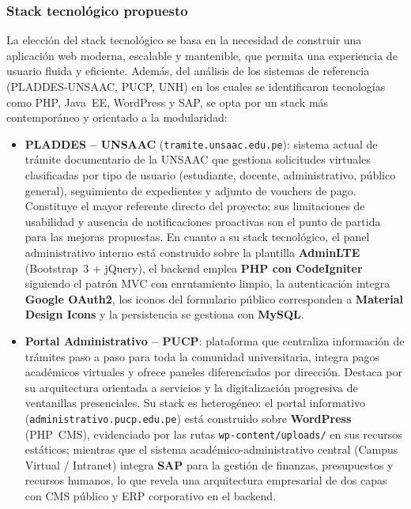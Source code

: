 \subsubsection{Stack tecnológico propuesto}
La elección del stack tecnológico se basa en la necesidad de construir una aplicación
web moderna, escalable y mantenible, que permita una experiencia de usuario fluida y
eficiente. Además, del análisis de los sistemas de referencia (PLADDES-UNSAAC, PUCP, UNH)
en los cuales se identificaron tecnologías como PHP, Java~EE, WordPress y SAP, se opta 
por un stack más contemporáneo y orientado a la modularidad:
\begin{itemize}
  \item \textbf{PLADDES -- UNSAAC} (\texttt{tramite.unsaac.edu.pe}): sistema actual
    de trámite documentario de la UNSAAC que gestiona solicitudes virtuales
    clasificadas por tipo de usuario (estudiante, docente, administrativo, público
    general), seguimiento de expedientes y adjunto de vouchers de pago.
    Constituye el mayor referente directo del proyecto; sus limitaciones de
    usabilidad y ausencia de notificaciones proactivas son el punto de partida
    para las mejoras propuestas.
    En cuanto a su stack tecnológico, el panel administrativo interno está
    construido sobre la plantilla \textbf{AdminLTE} (Bootstrap~3 + jQuery),
    el backend emplea \textbf{PHP con CodeIgniter} siguiendo el patrón MVC
    con enrutamiento limpio, la autenticación integra \textbf{Google OAuth2},
    los iconos del formulario público corresponden a \textbf{Material Design
    Icons} y la persistencia se gestiona con \textbf{MySQL}.

  \item \textbf{Portal Administrativo -- PUCP}: plataforma que centraliza
    información de trámites paso a paso para toda la comunidad universitaria,
    integra pagos académicos virtuales y ofrece paneles diferenciados por
    dirección. Destaca por su arquitectura orientada a servicios y la
    digitalización progresiva de ventanillas presenciales.
    Su stack es heterogéneo: el portal informativo
    (\texttt{administrativo.pucp.edu.pe}) está construido sobre \textbf{WordPress}
    (PHP~CMS), evidenciado por las rutas \texttt{wp-content/uploads/} en sus
    recursos estáticos; mientras que el sistema académico-administrativo central
    (Campus Virtual / Intranet) integra \textbf{SAP} para la gestión de finanzas,
    presupuestos y recursos humanos, lo que revela una arquitectura empresarial
    de dos capas con CMS público y ERP corporativo en el backend.


\end{itemize}
